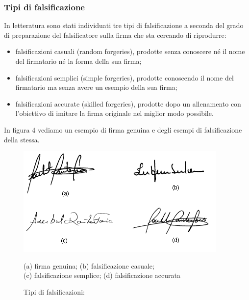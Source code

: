 \subsubsection{Tipi di falsificazione}
\label{2.1.2}
In letteratura sono stati individuati tre tipi di falsificazione a seconda del grado di preparazione del falsificatore sulla firma che sta cercando di riprodurre:
\begin{itemize}
\item falsificazioni casuali (random forgeries), prodotte senza conoscere né il nome del firmatario né la forma della sua firma;
\item falsificazioni semplici (simple forgeries), prodotte conoscendo il nome del firmatario ma senza avere un esempio della sua firma;
\item falsificazioni accurate (skilled forgeries), prodotte dopo un allenamento con l'obiettivo di imitare la firma originale nel miglior modo possibile.
\end{itemize}
In figura 4 vediamo un esempio di firma genuina e degli esempi di falsificazione della stessa.
\begin{figure}[H]
\centering
\includegraphics[scale=1.0]{../Logo&Header/esempiForged.png}
\caption{Tipi di falsificazioni:} (a) firma genuina; (b) falsificazione casuale;\\
(c) falsificazione semplice; (d) falsificazione accurata
\end{figure}

